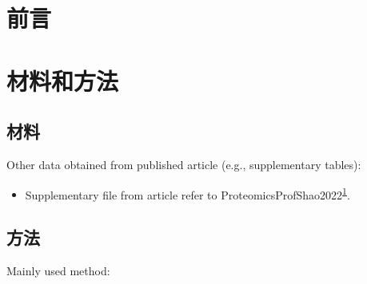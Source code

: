 \documentclass[
]{article}
\providecommand{\tightlist}{%
  \setlength{\itemsep}{0pt}\setlength{\parskip}{0pt}}
\begin{document}
\hypertarget{introduction}{%
\section{前言}\label{introduction}}

\hypertarget{methods}{%
\section{材料和方法}\label{methods}}

\hypertarget{ux6750ux6599}{%
\subsection{材料}\label{ux6750ux6599}}

Other data obtained from published article (e.g., supplementary tables):

\begin{itemize}
\tightlist
\item
  Supplementary file from article refer to ProteomicsProfShao2022\textsuperscript{\protect\hyperlink{ref-ProteomicsProfShao2022}{1}}.
\end{itemize}

\hypertarget{ux65b9ux6cd5}{%
\subsection{方法}\label{ux65b9ux6cd5}}

Mainly used method:
\end{document}
